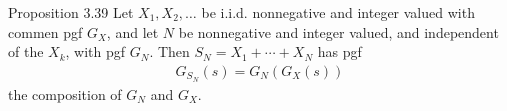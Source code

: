 %
%
\begin{boks}{Proposition 3.39}
  Let $X_1, X_2, \ldots$ be i.i.d. nonnegative and integer valued with commen pgf $G_X$, and let $N$ be nonnegative and integer valued, and independent of the $X_k$, with pgf $G_N$. Then $S_N = X_1 + \cdots + X_N$ has pgf
  \begin{align*}
    G_{S_N}(s) = G_N(G_X(s))
  \end{align*}
  the composition of $G_N$ and $G_X$.
\end{boks}

